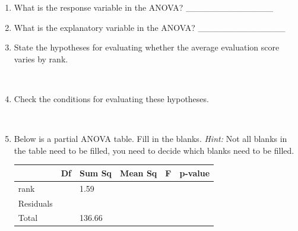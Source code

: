 \documentclass[11pt]{article}
\newcommand{\soln}[2]{$\:$\\ \vspace{#1}}{}
\begin{document}
\begin{enumerate}

\item What is the response variable in the ANOVA? \_\_\_\_\_\_\_\_\_\_\_\_\_\_ \soln{0cm}{Eval score}

\item What is the explanatory variable in the ANOVA? \_\_\_\_\_\_\_\_\_\_\_\_\_\_ \soln{0cm}{Rank}

\item State the hypotheses for evaluating whether the average evaluation score varies by rank.

\soln{5cm}{
$H_0$: Average eval score does not vary by rank. \\
$H_A$: Average eval score varies by rank, at least two means are different. 
}

\vfill

\pagebreak

\item Check the conditions for evaluating these hypotheses.

\soln{3cm}{
\begin{enumerate}
\item Independent observations: Random sampling + each group less than 10\% of its respective population
\item Normality: Distributions of each group not normal (left skewed) but n is large so not a huge deal
\item Constant variance: Variability across groups somewhat consistent
\end{enumerate}
}

\item Below is a partial ANOVA table. Fill in the blanks. \textit{Hint:} Not all blanks in the table need to be filled, 
you need to decide which blanks need to be filled.

\begin{center}
\renewcommand{\arraystretch}{1.5}
\begin{tabular}{l | p{1.5cm} | p{2cm} | p{2cm} | p{2cm} | p{2cm} }
  \hline
 			& Df 		& Sum Sq 	& Mean Sq 	& F 		 & p-value \\ 
  \hline
rank 			&  		& 1.59 		&  			& 	 	&  \\ 
\hline
Residuals 		& 	 	& 	 		& 	 		& 		&  \\ 
\hline
Total			&		& 136.66		&			&		&
\end{tabular}
\end{center}


\end{enumerate}
\end{document}
